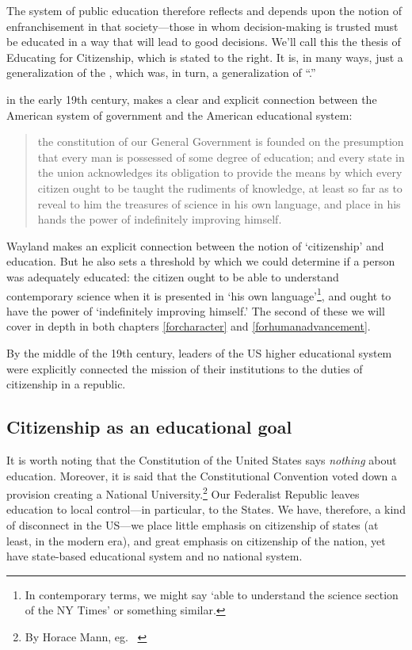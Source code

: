The system of public education therefore reflects and depends upon the notion of enfranchisement in that society---those in whom decision-making is trusted must be educated in a way that will lead to good decisions. We'll call this the thesis of Educating for Citizenship, which is stated to the right. It is, in many ways, just a generalization of the , which was, in turn, a generalization of ``.''

 in the early 19th century, makes a clear and explicit connection between the American system of government and the American educational system:

\begin{quote}

the constitution of our General Government is founded on the presumption that every man is possessed of some degree of education; and every state in the union acknowledges its obligation to provide the means by which every citizen ought to be taught the rudiments of knowledge, at least so far as to reveal to him the treasures of science in his own language, and place in his hands the power of indefinitely improving himself.~\citep[p 1--2]{Wayland:1842tw}
\end{quote}

Wayland makes an explicit connection between the notion of `citizenship' and education. But he also sets a threshold by which we could determine if a person was adequately educated: the citizen ought to be able to understand contemporary science when it is presented in `his own language'\footnote{In contemporary terms, we might say `able to understand the science section of the NY Times' or something similar.}, and ought to have the power of `indefinitely improving himself.' The second of these we will cover in depth in both chapters \ref{forcharacter} and \ref{forhumanadvancement}.

By the middle of the 19th century, leaders of the US higher educational system were explicitly connected the mission of their institutions to the duties of citizenship in a republic. 

\subsection{Citizenship as an educational goal}
\label{citizenshipasaneducationalgoal}

It is worth noting that the Constitution of the United States says \emph{nothing} about education. Moreover, it is said that the Constitutional Convention voted down a provision creating a National University.\footnote{By Horace Mann, eg. ~\citep[p. 264]{Mann:1867ve}} Our Federalist Republic leaves education to local control---in particular, to the States. We have, therefore, a kind of disconnect in the US---we place little emphasis on citizenship of states (at least, in the modern era), and great emphasis on citizenship of the nation, yet have state-based educational system and no national system.


